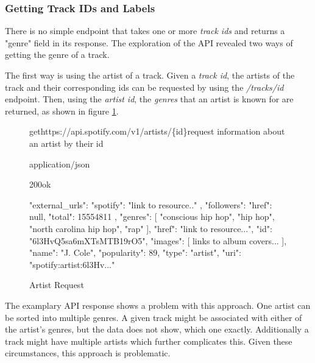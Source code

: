 \subsubsection{Getting Track IDs and Labels}

There is no simple endpoint that takes one or more \emph{track ids} and returns  a "genre" field
in its response. The exploration of the API revealed two ways of getting the genre of a track. 

The first way is using the artist of a track. Given a \emph{track id}, the artists of the track and their corresponding
ids can be requested by using the \emph{/tracks/{id}} endpoint. Then, using the \emph{artist id}, the \emph{genres} that an
artist is known for are returned, as shown in figure \ref{fig:Artist Request}.

\begin{figure}[H]
    \caption{Artist Request}
	\label{fig:Artist Request}
\begin{apiRoute}{get}{https://api.spotify.com/v1/artists/\{id\}}{request information about an artist by their id}
    \begin{routeParameter}
    \end{routeParameter}
    \begin{routeResponse}{application/json}
        \begin{routeResponseItem}{200}{ok}
            \begin{routeResponseItemBody}
{
    "external_urls": {
        "spotify": "link to resource.."
    },
    "followers": {
        "href": null,
        "total": 15554811
    },
    "genres": [
        "conscious hip hop",
        "hip hop",
        "north carolina hip hop",
        "rap"
    ],
    "href": "link to resource...",
    "id": "6l3HvQ5sa6mXTsMTB19rO5",
    "images": [ links to album covers... ],
    "name": "J. Cole",
    "popularity": 89,
    "type": "artist",
    "uri": "spotify:artist:6l3Hv..."
}
            \end{routeResponseItemBody}
        \end{routeResponseItem}
    \end{routeResponse}
\end{apiRoute}
\end{figure}

The examplary API response shows a problem with this approach. One artist can be sorted
into multiple genres.
A given track might be associated with either of the artist's genres, but the data does
not show, which one exactly.
Additionally a track might have multiple artists which further complicates this.
Given these circumstances, this approach is problematic.

